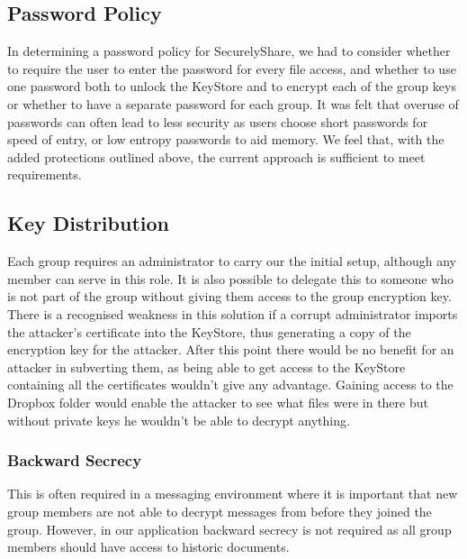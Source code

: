 \subsection*{Password Policy}
In determining a password policy for SecurelyShare, we had to consider whether to require the user to enter the password for every file access, and whether to  use one password both to unlock the KeyStore and to encrypt each of the group keys or whether to have a separate password for each group.  It was felt that overuse of passwords can often lead to less security as users choose short passwords for speed of entry, or low entropy passwords to aid memory.  We feel that, with the added protections outlined above, the current approach is sufficient to meet requirements.


\subsection*{Key Distribution}

Each group requires an administrator to carry our the initial setup, although any member can serve in this role.  It is also possible to delegate this to someone who is not part of the group without giving them access to the group encryption key.   There is a recognised weakness in this solution if a corrupt administrator imports the attacker's certificate into the KeyStore, thus generating a copy of the encryption key for the attacker. After this point there would be no benefit for an attacker in subverting them, as being able to get access to the KeyStore containing all the certificates wouldn't give any advantage.  Gaining access to the Dropbox folder would enable the attacker to see what files were in there but without private keys he wouldn't be able to decrypt anything.


\subsubsection*{Backward Secrecy}
This is often required in a messaging environment where it is important that new group members are not able to decrypt messages from before they joined the group. However, in our application backward secrecy is not required as all group members should have access to historic documents.


